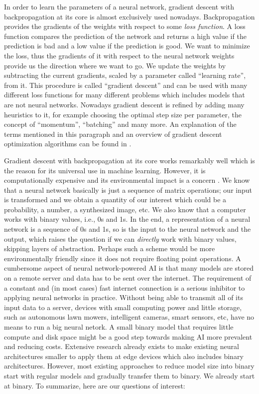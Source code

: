In order to learn the parameters of a neural network, gradient descent with backpropagation \cite{linnainmaa1976taylor} at its core is almost exclusively used nowadays. Backpropagation provides the gradients of the weights with respect to some \textit{loss function}. A loss function compares the prediction of the network and returns a high value if the prediction is bad and a low value if the prediction is good. We want to minimize the loss, thus the gradients of it with respect to the neural network weights provide us the direction where we want to go. We update the weights by subtracting the current gradients, scaled by a parameter called \enquote{learning rate}, from it. This procedure is called \enquote{gradient descent} and can be used with many different loss functions for many different problems which includes models that are not neural networks. Nowadays gradient descent is refined by adding many heuristics to it, for example choosing the optimal step size per parameter, the concept of \enquote{momentum}, \enquote{batching} and many more. An explanation of the terms mentioned in this paragraph and an overview of gradient descent optimization algorithms can be found in \cite{ruder2016overview}.

Gradient descent with backpropagation at its core works remarkably well which is the reason for its universal use in machine learning. However, it is computationally expensive and its environmental impact is a concern \cite{schwartz2020green}. We know that a neural network basically is just a sequence of matrix operations; our input is transformed and we obtain a quantity of our interest which could be a probability, a number, a synthesized image, etc. We also know that a computer works with binary values, i.e., 0s and 1s. In the end, a representation of a neural network is a sequence of 0s and 1s, so is the input to the neural network and the output, which raises the question if we can \textit{directly} work with binary values, skipping layers of abstraction. Perhaps such a scheme would be more environmentally friendly since it does not require floating point operations. A cumbersome aspect of neural network-powered AI is that many models are stored on a remote server and data has to be sent over the internet. The requirement of a constant and (in most cases) fast internet connection is a serious inhibitor to applying neural networks in practice. Without being able to transmit all of its input data to a server, devices with small computing power and little storage, such as autonomous lawn mowers, intelligent cameras, smart sensors, etc, have no means to run a big neural netork. A small binary model that requires little compute and disk space might be a good step towards making AI more prevalent and reducing costs. Extensive research already exists to make existing neural architectures smaller to apply them at edge devices \cite{liu2021bringing} which also includes binary architectures. However, most existing approaches to reduce model size into binary start with regular models and gradually transfer them to binary. We already start at binary. To summarize, here are our questions of interest:


